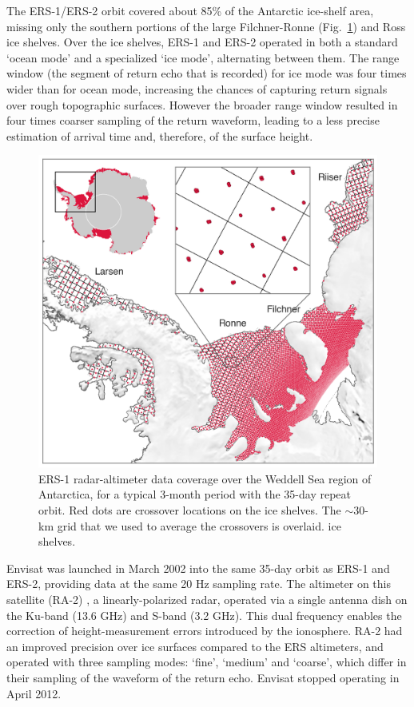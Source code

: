 The ERS-1/ERS-2 orbit covered about 85\% of the Antarctic ice-shelf area, missing only the southern portions of the large Filchner-Ronne (Fig.~\ref{c2f1}) and Ross ice shelves. Over the ice shelves, ERS-1 and ERS-2 operated in both a standard `ocean mode' and a specialized `ice mode', alternating between them. The range window (the segment of return echo that is recorded) for ice mode was four times wider than for ocean mode, increasing the chances of capturing return signals over rough topographic surfaces. However the broader range window resulted in four times coarser sampling of the return waveform, leading to a less precise estimation of arrival time and, therefore, of the surface height.


\begin{figure}[!ht]
  \centering
  \includegraphics[width=.78\textwidth]{img/map_xovers_grid_v8.png}
  \caption[ERS-1 radar-altimeter data coverage over the Weddell Sea]{
  \ssp \footnotesize
  ERS-1 radar-altimeter data coverage over the Weddell Sea region of Antarctica, for a typical 3-month period with the 35-day repeat orbit. Red dots are crossover locations on the ice shelves. The $\sim$30-km grid that we used to average the crossovers is overlaid. 
  ice shelves.} 
  \label{c2f1}
\end{figure}


Envisat was launched in March 2002 into the same 35-day orbit as ERS-1 and ERS-2, providing data at the same 20 Hz sampling rate. The altimeter on this satellite (RA-2) \parencite{Roca2009}, a linearly-polarized radar, operated via a single antenna dish on the Ku-band (13.6 GHz) and S-band (3.2 GHz). This dual frequency enables the correction of height-measurement errors introduced by the ionosphere. RA-2 had an improved precision over ice surfaces compared to the ERS altimeters, and operated with three sampling modes: `fine', `medium' and `coarse', which differ in their sampling of the waveform of the return echo. Envisat stopped operating in April 2012.

